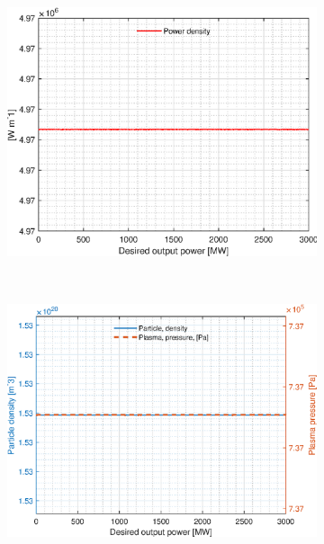 \begin{figure}[H]
	\begin{subfigure}[b]{.45\textwidth}
		\includegraphics[width=\textwidth]{MatlabFigures/PE/f5.eps}
	\end{subfigure}
	~
	\begin{subfigure}[b]{.45\textwidth}
		\includegraphics[width=\textwidth]{MatlabFigures/PE/f6.eps}
	\end{subfigure}


\end{figure}
